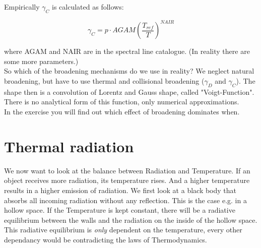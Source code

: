 Empirically $\gamma_{C}$ is calculated as follows:

\begin{equation}
\gamma_{C} = p \cdot AGAM (\frac{T_{ref}}{T})^{NAIR}
\end{equation}

where AGAM and NAIR are in the spectral line catalogue. (In reality there are some more parameters.) \\

So which of the broadening mechanisms do we use in reality? We neglect natural broadening, but have to use thermal and collisional broadening ($\gamma_{D}$ and $\gamma_{C}$). The shape then is a convolution of Lorentz and Gauss shape, called "Voigt-Function". There is no analytical form of this function, only numerical approximations. \\

In the exercise you will find out which effect of broadening dominates when. 

\section{Thermal radiation}

We now want to look at the balance between Radiation and Temperature. If an object receives more radiation, its temperature rises. And a higher temperature results in a higher emission of radiation. We first look at a black body that absorbs all incoming radiation without any reflection. This is the case e.g. in a hollow space. If the Temperature is kept constant, there will be a radiative equilibrium between the walls and the radiation on the inside of the hollow space. This radiative equilibrium is \textit{only} dependent on the temperature, every other dependancy would be contradicting the laws of Thermodynamics.

